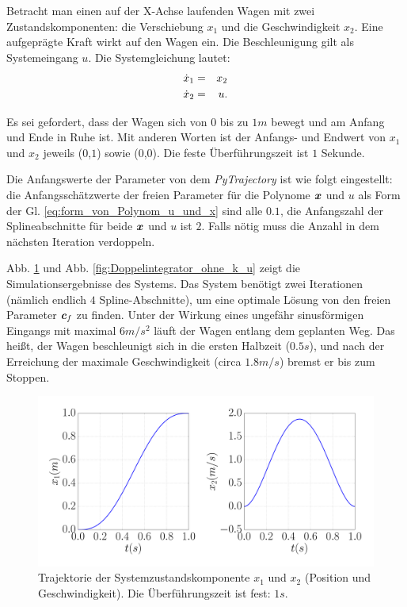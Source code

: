 \begin{beispiel}\label{bp:Dooelintegrator_ori}
 	Betracht man einen auf der X-Achse laufenden Wagen mit zwei Zustandskomponenten: die Verschiebung $x_{1}$ und die Geschwindigkeit $x_{2}$. Eine aufgeprägte Kraft wirkt auf den Wagen ein. Die Beschleunigung gilt als Systemeingang $u$. Die Systemgleichung lautet:
 	\begin{eqnarray}
 	\dot{x}_{1} &=& x_{2}\notag\\
 	\dot{x}_{2} &=& u.
 	\label{eq:Doppelintegrator}
 	\end{eqnarray}
 	
	Es sei gefordert, dass der Wagen sich von $0$ bis zu $1m$ bewegt und am Anfang und Ende in Ruhe ist. Mit anderen Worten ist der Anfangs- und Endwert von $x_{1}$ und $x_{2}$ jeweils ($0$,$1$) sowie ($0$,$0$). Die feste Überführungszeit ist $1$ Sekunde. 
	
	Die Anfangswerte der Parameter von dem \emph{PyTrajectory} ist wie folgt eingestellt: die Anfangsschätzwerte der freien Parameter für die Polynome $\boldsymbol x$ und $u$ als Form der Gl. \eqref{eq:form_von_Polynom_u_und_x} sind alle $0.1$, die Anfangszahl der Splineabschnitte für beide $\boldsymbol x$ und $u$ ist $2$. Falls nötig muss die Anzahl in dem nächsten Iteration verdoppeln.
	
	Abb. \ref{fig:Doppelintegrator_ohne_k_x} und Abb. \ref{fig:Doppelintegrator_ohne_k_u} zeigt die Simulationsergebnisse des Systems. Das System benötigt zwei Iterationen (nämlich endlich $4$ Spline-Abschnitte), um eine optimale Lösung von den freien Parameter $\boldsymbol c_{f}$ zu finden. Unter der Wirkung eines ungefähr sinusförmigen Eingangs mit maximal $6m/s^{2}$ läuft der Wagen entlang dem geplanten Weg. Das heißt, der Wagen beschleunigt sich in die ersten Halbzeit ($0.5s$), und nach der Erreichung der maximale Geschwindigkeit (circa $1.8m/s$) bremst er bis zum Stoppen.
	\begin{figure}[!h]
		\centering
		\includegraphics[width=0.7\linewidth]{bild/30_32/test0_ohne_k_ori_x.pdf} %
		\caption[Trajektorie der Systemzustandskomponente $x_{1}$ und $x_{2}$ (Position und Geschwindigkeit).]{Trajektorie der Systemzustandskomponente $x_{1}$ und $x_{2}$ (Position und Geschwindigkeit). Die Überführungszeit ist fest: $1s$.}
		\label{fig:Doppelintegrator_ohne_k_x}
	\end{figure}
	

\end{beispiel}
